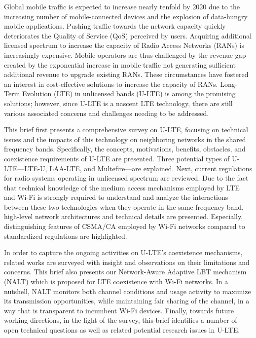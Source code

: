 %
%

\preface

Global mobile traffic is expected to increase nearly tenfold by 2020 due to the increasing number of mobile-connected devices and the explosion of data-hungry mobile applications. Pushing traffic towards the network capacity quickly deteriorates the Quality of Service (QoS) perceived by users. Acquiring additional licensed spectrum to increase the capacity of Radio Access Networks (RANs) is increasingly expensive. Mobile operators are thus challenged by the revenue gap created by the exponential increase in mobile traffic not generating sufficient additional revenue to upgrade existing RANs. These circumstances have fostered an interest in cost-effective solutions to increase the capacity of RANs. Long-Term Evolution (LTE) in unlicensed bands (U-LTE) is among the promising solutions; however, since U-LTE is a nascent LTE technology, there are still various associated concerns and challenges needing to be addressed.

This brief first presents a comprehensive survey on U-LTE, focusing on technical issues and the impacts of this technology on neighboring networks in the shared frequency bands. Specifically, the concepts, motivations, benefits, obstacles, and coexistence requirements of U-LTE are presented. Three potential types of U-LTE---LTE-U, LAA-LTE, and Multefire---are explained. Next, current regulations for radio systems operating in unlicensed spectrum are reviewed. Due to the fact that technical knowledge of the medium access mechanisms employed by LTE and Wi-Fi is strongly required to understand and analyze the interactions between these two technologies when they operate in the same frequency band, high-level network architectures and technical details are presented. Especially, distinguishing features of CSMA/CA employed by Wi-Fi networks compared to standardized regulations are highlighted.   

In order to capture the ongoing activities on U-LTE’s coexistence mechanisms, related works are surveyed with insight and observations on their limitations and concerns.  This brief also presents our Network-Aware Adaptive LBT mechanism (NALT) which is proposed for LTE coexistence with Wi-Fi networks. In a nutshell, NALT monitors both channel conditions and usage activity to maximize its transmission opportunities, while maintaining fair sharing of the channel, in a way that is transparent to incumbent Wi-Fi devices. Finally, towards future working directions, in the light of the survey, this brief identifies a number of open technical questions as well as related potential research issues in U-LTE.

